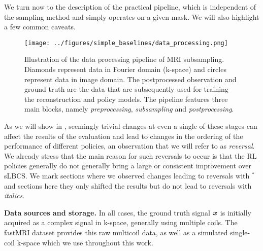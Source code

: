 We turn now to the description of the practical pipeline, which is independent of the sampling method and simply operates on a given mask. We will also highlight a few common caveats.

\begin{figure}[!ht]
    \centering
    \texttt{[image: ../figures/simple\_baselines/data\_processing.png]}
    \caption{Illustration of the data processing pipeline of MRI subsampling. Diamonds represent data in Fourier domain (k-space) and circles represent data in image domain. The postprocessed observation and ground truth are the data that are subsequently used for training the reconstruction and policy models. The pipeline features three main blocks, namely \textit{preprocessing}, \textit{subsampling} and \textit{postprocessing}.}
    \label{fig:data_processing}
\end{figure}

As we will show in , seemingly trivial changes at even a single of these stages can affect the results of the evaluation and lead to changes in the ordering of the performance of different policies, an observation that we will refer to as \textit{reversal}. We already stress that the main reason for such reversals to occur is that the RL policies generally do not generally bring a large or consistent improvement over sLBCS.
We mark sections where we observed changes leading to reversals with $^*$  and sections here they only shifted the results but do not lead to reversals with \textit{italics}.

\textbf{Data sources and storage.} In all cases, the ground truth signal ${\bm{x}}$ is initially acquired as a complex signal in k-space, generally using multiple coils. The fastMRI dataset \citep{zbontarFastMRIOpenDataset2019} provides this raw multicoil data, as well as a simulated single-coil k-space which we use throughout this work.

